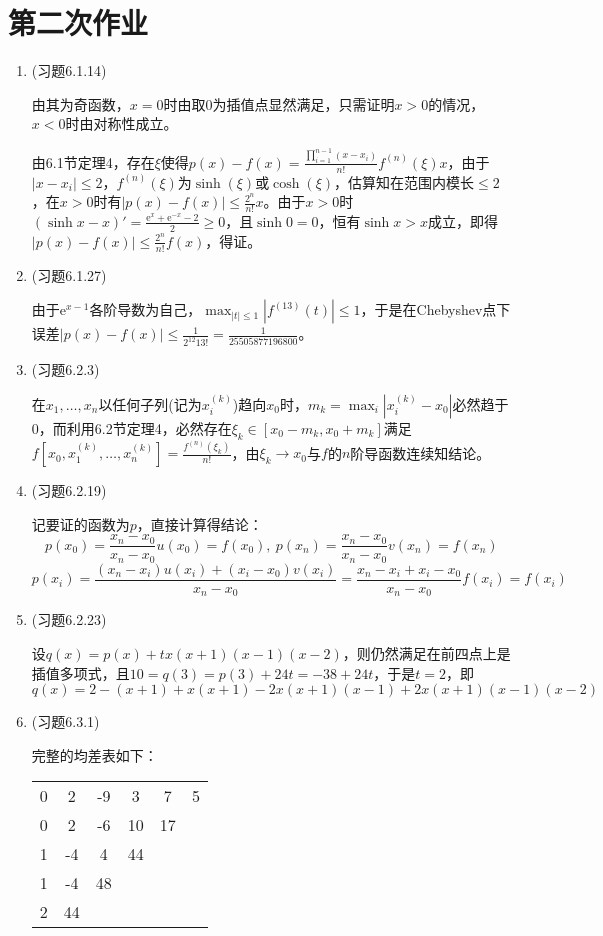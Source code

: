 \documentclass[a4paper,UTF8,fontset=windows]{ctexart}
\begin{document}
\section{第二次作业}
\begin{enumerate}
    \item (习题6.1.14)
    
    由其为奇函数，$x=0$时由取0为插值点显然满足，只需证明$x>0$的情况，$x<0$时由对称性成立。
    
    由6.1节定理4，存在$\xi$使得$p(x)-f(x)=\frac{\prod_{i=1}^{n-1}(x-x_i)}{n!}f^{(n)}(\xi)x$，由于$|x-x_i|\le2$，$f^(n)(\xi)$为$\sinh(\xi)$或$\cosh(\xi)$，估算知在范围内模长$\le 2$，在$x>0$时有$|p(x)-f(x)|\le\frac{2^n}{n!}x$。由于$x>0$时$(\sinh x-x)'=\frac{\mathrm{e}^x+\mathrm{e}^{-x}-2}{2}\ge0$，且$\sinh0=0$，恒有$\sinh x>x$成立，即得$|p(x)-f(x)|\le\frac{2^n}{n!}f(x)$，得证。
    
    \item (习题6.1.27)
    
    由于$\mathrm{e}^{x-1}$各阶导数为自己，$\max_{|t|\le1}|f^{(13)}(t)|\le1$，于是在Chebyshev点下误差$|p(x)-f(x)|\le\frac{1}{2^{12}13!}=\frac{1}{25505877196800}$。
    
    \item (习题6.2.3)
    
    在$x_1,\dots,x_n$以任何子列(记为$x_i^{(k)}$)趋向$x_0$时，$m_k=\max_i|x_i^{(k)}-x_0|$必然趋于0，而利用6.2节定理4，必然存在$\xi_k\in[x_0-m_k,x_0+m_k]$满足$f[x_0,x_1^{(k)},\dots,x_n^{(k)}]=\frac{f^{(n)}(\xi_k)}{n!}$，由$\xi_k\to x_0$与$f$的$n$阶导函数连续知结论。
    
    \item (习题6.2.19)
    
    记要证的函数为$p$，直接计算得结论：
    $$p(x_0)=\frac{x_n-x_0}{x_n-x_0}u(x_0)=f(x_0),\ p(x_n)=\frac{x_n-x_0}{x_n-x_0}v(x_n)=f(x_n)$$
    $$p(x_i)=\frac{(x_n-x_i)u(x_i)+(x_i-x_0)v(x_i)}{x_n-x_0}=\frac{x_n-x_i+x_i-x_0}{x_n-x_0}f(x_i)=f(x_i)$$
    
    \item (习题6.2.23)
    
    设$q(x)=p(x)+tx(x+1)(x-1)(x-2)$，则仍然满足在前四点上是插值多项式，且$10=q(3)=p(3)+24t=-38+24t$，于是$t=2$，即
    $$q(x)=2-(x+1)+x(x+1)-2x(x+1)(x-1)+2x(x+1)(x-1)(x-2)$$
    
    \item (习题6.3.1)
    
    完整的均差表如下：
    
        \begin{tabular}[htbp]{cc|cccc}
            0 & 2 & -9 & 3 & 7 & 5 \\
            0 & 2 & -6 & 10 & 17 \\
            1 & -4 & 4 & 44 \\
            1 & -4 & 48 \\
            2 & 44 
        \end{tabular}
    

\end{enumerate}
\end{document}
